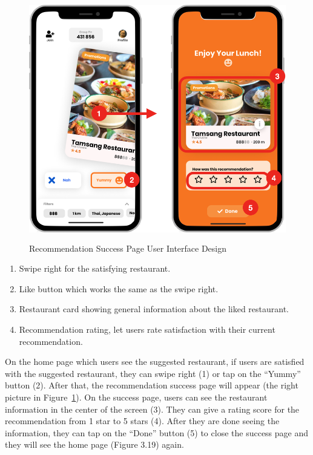 \documentclass[12pt,oneside,openright,a4paper]{cpe-english-project}
\begin{document}
\begin{figure}[H]\centering
\includegraphics[height=300pt]{./images/3ui_RecommendationSuccessPageUserInterfaceDesign.png}
\caption{Recommendation Success Page User Interface Design}\label{fig:3ui_RecommendationSuccessPageUserInterfaceDesign}
\end{figure}
\begin{enumerate}
\item Swipe right for the satisfying restaurant.
\item Like button which works the same as the swipe right.
\item Restaurant card showing general information about the liked restaurant.
\item Recommendation rating, let users rate satisfaction with their current recommendation.
\end{enumerate}
On the home page which users see the suggested restaurant, if users are satisfied with the suggested restaurant, they can swipe right (1) or tap on the “Yummy” button (2). After that, the recommendation success page will appear (the right picture in Figure~\ref{fig:3ui_RecommendationSuccessPageUserInterfaceDesign}). On the success page, users can see the restaurant information in the center of the screen (3). They can give a rating score for the recommendation from 1 star to 5 stars (4). After they are done seeing the information, they can tap on the “Done” button (5) to close the success page and they will see the home page (Figure 3.19) again.
\newpage
\end{document}

